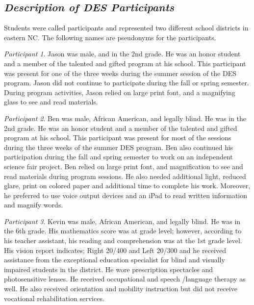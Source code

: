 \documentclass[11.5pt]{sig-alternate}
\begin{document}
\begin{large}
\begin{table}[h]
\centering
\caption{\textit{Information for students that participated in the DES program.}}
\label{tab:my-table}
\end{table}

\section*{\textit{Description of DES Participants}}
 
Students were called participants and represented two different school districts in eastern NC. The following names are pseudonyms for the participants.  

\textit{Participant 1}. Jason was male, and in the 2nd grade. He was an honor student and a member of the talented and gifted program at his school. This participant was present for one of the three weeks during the summer session of the DES program. Jason did not continue to participate during the fall or spring semester.  During program activities, Jason relied on large print font, and a magnifying glass to see and read materials.

\textit{Participant 2}. Ben was male, African American, and legally blind. He was in the 2nd grade. He was an honor student and a member of the talented and gifted program at his school. This participant was present for most of the sessions during the three weeks of the summer DES program.  Ben also continued his participation during the fall and spring semester to work on an independent science fair project.  Ben relied on large print font, and magnification to see and read materials during program sessions. He also needed additional light, reduced glare, print on colored paper and additional time to complete his work. Moreover, he preferred to use voice output devices and an iPad to read written information and magnify words.

\textit{Participant 3}. Kevin was male, African American, and legally blind. He was in the 6th grade. His mathematics score was at grade level; however, according to his teacher assistant, his reading and comprehension was at the 1st grade level. His vision report indicates; Right 20/400 and Left 20/300 and he received assistance from the exceptional education specialist for blind and visually impaired students in the district. He wore prescription spectacles and photosensitive lenses. He received occupational and speech /language therapy as well. He also received orientation and mobility instruction but did not receive vocational rehabilitation services.


\end{large}
\end{document}
